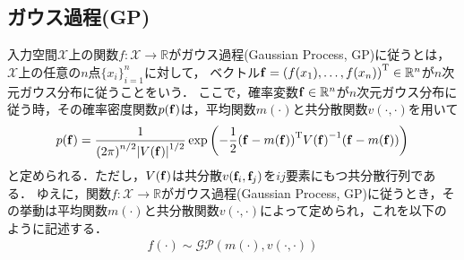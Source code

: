 \documentclass[11pt,a4j]{article}
\begin{document}
    \subsection{ガウス過程(GP)}
      入力空間$\mathcal{X}$上の関数$f: \mathcal{X} \to \mathbb{R}$がガウス過程(Gaussian Process, GP)に従うとは，$\mathcal{X}$上の任意の$n$点${ \{ x_i \} }_{i=1}^{n}$に対して，
      ベクトル${\bf f} = { ( f(x_1),\dots,f(x_n) ) }^{\mathrm{T}} \in \mathbb{R}^{n}$が$n$次元ガウス分布に従うことをいう．
      ここで，確率変数${\bf f} \in \mathbb{R}^{n}$が$n$次元ガウス分布に従う時，その確率密度関数$p({\bf f})$は，平均関数${m}(\cdot)$と共分散関数$v(\cdot,\cdot)$を用いて
      \begin{align}
        p({\bf f}) = \frac{1}{ {(2 \pi)}^{n/2} {| V({\bf f}) |}^{1/2} } \exp \left( {- \frac{1}{2}} {({\bf f} - m(\bf f))}^{\mathrm{T}} {V({\bf f})}^{-1} ({\bf f} - m(\bf f)) \right)
      \end{align}
      と定められる．ただし，$V({\bf f})$は共分散$v({\bf f}_i, {\bf f}_j)$を$ij$要素にもつ共分散行列である．
      ゆえに，関数$f: \mathcal{X} \to \mathbb{R}$がガウス過程(Gaussian Process, GP)に従うとき，その挙動は平均関数${m}(\cdot)$と共分散関数$v(\cdot,\cdot)$によって定められ，これを以下のように記述する．
      \begin{align}
        f(\cdot) \sim \mathcal{GP}(m(\cdot), v(\cdot,\cdot))
      \end{align}    
\end{document}
